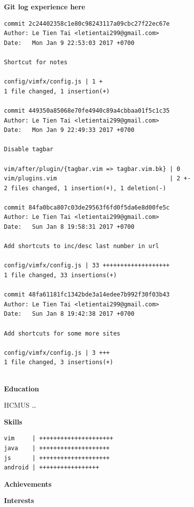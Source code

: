 \documentclass[a4paper]{article}
\begin{document}
\vspace{10pt}
\noindent
  \begin{minipage}[t]{0.6\textwidth}
    \textbf{Git log experience here}
    \begin{verbatim}
commit 2c24402358c1e80c98243117a09cbc27f22ec67e
Author: Le Tien Tai <letientai299@gmail.com>
Date:   Mon Jan 9 22:53:03 2017 +0700

Shortcut for notes

config/vimfx/config.js | 1 +
1 file changed, 1 insertion(+)

commit 449350a85068e70fe4940c89a4cbbaa01f5c1c35
Author: Le Tien Tai <letientai299@gmail.com>
Date:   Mon Jan 9 22:49:33 2017 +0700

Disable tagbar

vim/after/plugin/{tagbar.vim => tagbar.vim.bk} | 0
vim/plugins.vim                                | 2 +-
2 files changed, 1 insertion(+), 1 deletion(-)

commit 84fa0bca807c03de29563f6fd0f5da6e8d00fe5c
Author: Le Tien Tai <letientai299@gmail.com>
Date:   Sun Jan 8 19:58:31 2017 +0700

Add shortcuts to inc/desc last number in url

config/vimfx/config.js | 33 +++++++++++++++++++
1 file changed, 33 insertions(+)

commit 48fa61181fc1342bde3a14edee7b992f30f03b43
Author: Le Tien Tai <letientai299@gmail.com>
Date:   Sun Jan 8 19:42:38 2017 +0700

Add shortcuts for some more sites

config/vimfx/config.js | 3 +++
1 file changed, 3 insertions(+)


    \end{verbatim}
    
    \textbf{Education}
    
    HCMUS
    \ldots
  \end{minipage}
  \begin{minipage}[t]{0.4\textwidth}
    \textbf{Skills}
    \begin{verbatim}
vim     | +++++++++++++++++++++
java    | ++++++++++++++++++++
js      | ++++++++++++++++++++
android | +++++++++++++++++
    \end{verbatim}
    \textbf{Achievements}

    \textbf{Interests}
  \end{minipage}
\end{document}
